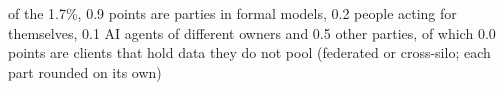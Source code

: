 of the 1.7\%, 0.9 points are parties in formal models, 0.2 people acting for themselves, 0.1 AI agents of different owners and 0.5 other parties, of which 0.0 points are clients that hold data they do not pool (federated or cross-silo; each part rounded on its own)